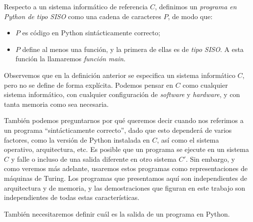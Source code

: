 \begin{definicion}\label{def:programa-siso}
Respecto a un sistema informático de referencia $C$, definimos un \emph{programa en Python de tipo SISO} como una cadena de caracteres $P$, de modo que:

\begin{itemize}
    \item $P$ es código en Python sintácticamente correcto;
    \item $P$ define al menos una función, y la primera de ellas es de \emph{tipo SISO}. A esta función la llamaremos \emph{función main}.
\end{itemize}
\end{definicion}

Observemos que en la definición anterior se especifica un sistema informático $C$, pero no se define de forma explícita. Podemos pensar en $C$ como cualquier sistema informático, con cualquier configuración de \emph{software} y \emph{hardware}, y con tanta memoria como sea necesaria.

También podemos preguntarnos por qué queremos decir cuando nos referimos a un programa ``sintácticamente correcto'', dado que esto dependerá de varios factores, como la versión de Python instalada en $C$, así como el sistema operativo, arquitectura, etc. Es posible que un programa se ejecute en un sistema $C$ y falle o incluso de una salida diferente en otro sistema $C'$. Sin embargo, y como veremos más adelante, usaremos estos programas como representaciones de máquinas de Turing. Los programas que presentamos aquí son independientes de arquitectura y de memoria, y las demostraciones que figuran en este trabajo son independientes de todas estas características.

También necesitaremos definir cuál es la salida de un programa en Python.

